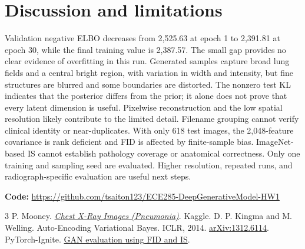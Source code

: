 \documentclass{article}
\begin{document}
\section{Discussion and limitations}
Validation negative ELBO decreases from 2,525.63 at epoch 1 to 2,391.81 at epoch 30, while the final training value is 2,387.57. The small gap provides no clear evidence of overfitting in this run. Generated samples capture broad lung fields and a central bright region, with variation in width and intensity, but fine structures are blurred and some boundaries are distorted. The nonzero test KL indicates that the posterior differs from the prior; it alone does not prove that every latent dimension is useful. Pixelwise reconstruction and the low spatial resolution likely contribute to the limited detail.
Filename grouping cannot verify clinical identity or near-duplicates.
With only 618 test images, the 2,048-feature covariance is rank deficient and
FID is affected by finite-sample bias. ImageNet-based IS cannot establish pathology
coverage or anatomical correctness. Only one training and sampling seed are evaluated.
Higher resolution, repeated runs, and radiograph-specific evaluation are useful next steps.

\small
\noindent\textbf{Code:} \url{https://github.com/tsaiton123/ECE285-DeepGenerativeModel-HW1}
\begin{thebibliography}{3}
\setlength{\itemsep}{0pt}
 P. Mooney. \href{https://www.kaggle.com/datasets/paultimothymooney/chest-xray-pneumonia}{\emph{Chest X-Ray Images (Pneumonia)}}. Kaggle.
 D. P. Kingma and M. Welling. Auto-Encoding Variational Bayes. ICLR, 2014.
\href{https://arxiv.org/abs/1312.6114}{arXiv:1312.6114}.
 PyTorch-Ignite. \href{https://pytorch-ignite.ai/blog/gan-evaluation-with-fid-and-is/}{GAN evaluation using FID and IS}.
\end{thebibliography}
\end{document}
